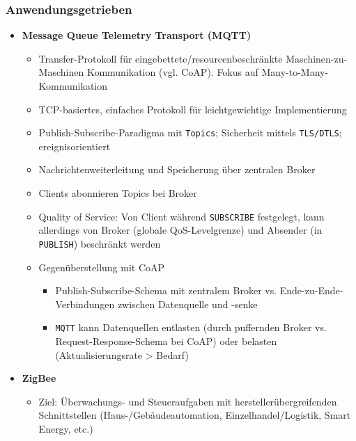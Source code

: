 \subsubsection{Anwendungsgetrieben}
\begin{itemize}
	\item \textbf{Message Queue Telemetry Transport (MQTT)}
	\begin{itemize}
		\item Transfer-Protokoll für eingebettete/resourcenbeschränkte Maschinen-zu-Maschinen Kommunikation (vgl. CoAP). Fokus auf Many-to-Many-Kommunikation
		\item TCP-basiertes, einfaches Protokoll für leichtgewichtige Implementierung
		\item Publish-Subscribe-Paradigma mit \texttt{Topics}; Sicherheit mittels \texttt{TLS/DTLS}; ereignisorientiert
		\item Nachrichtenweiterleitung und Speicherung über zentralen Broker
		\item Clients abonnieren Topics bei Broker
		\item Quality of Service: Von Client während \texttt{SUBSCRIBE} festgelegt, kann allerdings von Broker (globale QoS-Levelgrenze) und Absender (in \texttt{PUBLISH}) beschränkt werden
		\item Gegenüberstellung mit CoAP
		\begin{itemize}
			\item Publish-Subscribe-Schema mit zentralem Broker vs. Ende-zu-Ende-Verbindungen zwischen Datenquelle und -senke
			\item \texttt{MQTT} kann Datenquellen entlasten (durch puffernden Broker vs. Request-Response-Schema bei CoAP) oder belasten (Aktualisierungsrate > Bedarf)
		\end{itemize}
	\end{itemize}
	\item \textbf{ZigBee}
	\begin{itemize}
		\item Ziel: Überwachungs- und Steueraufgaben mit herstellerübergreifenden Schnittstellen (Haus-/Gebäudeautomation, Einzelhandel/Logistik, Smart Energy, etc.)

\end{itemize}
\end{itemize}
